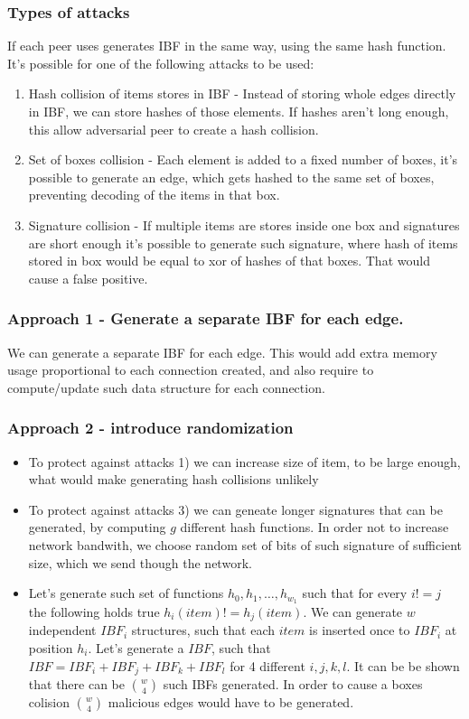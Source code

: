 \documentclass[11pt]{article}
\begin{document}
\subsubsection{Types of attacks}
If each peer uses generates IBF in the same way, using the same hash function.
It's possible for one of the following attacks to be used:
\begin{enumerate}
\item Hash collision of items stores in IBF -  Instead of storing whole edges directly in IBF, we can store hashes of those elements.
If hashes aren't long enough, this allow adversarial peer to create a hash collision.
\item Set of boxes collision - Each element is added to a fixed number of boxes, it's possible to generate an edge, which gets hashed to the same set of boxes, preventing decoding of the items in that box.
\item Signature collision - If multiple items are stores inside one box and signatures are short enough it's possible to generate such signature, where hash of items stored in box would be equal to xor of hashes of that boxes.
That would cause a false positive.
\end{enumerate}
\subsubsection{Approach 1 - Generate a separate IBF for each edge.}
We can generate a separate IBF for each edge.
This would add extra memory usage proportional to each connection created, and also require to compute/update such data structure for each connection.
\subsubsection{Approach 2 - introduce randomization}
\begin{itemize}
\item To protect against attacks 1) we can increase size of item, to be large enough, what would make generating hash collisions unlikely
\item To protect against attacks 3) we can geneate longer signatures that can be generated, by computing $g$ different hash functions.
In order not to increase network bandwith, we choose random set of bits of such signature of sufficient size, which we send though the network.
\item Let's generate such set of functions $h_0, h_1, \ldots, h_{w_1}$ such that for every $i != j$ the following holds true $h_i(item) != h_j(item)$.
We can generate $w$ independent $IBF_i$ structures, such that each $item$ is inserted once to $IBF_i$ at position $h_i$.
Let's generate a  $IBF$, such that $IBF = IBF_i + IBF_j + IBF_k + IBF_l$ for 4 different $i,j,k,l$.
It can be be shown that there can be $\binom{w}{4}$ such IBFs generated.
In order to cause a boxes colision $\binom{w}{4}$ malicious edges would have to be generated.

\end{itemize}
\end{document}
